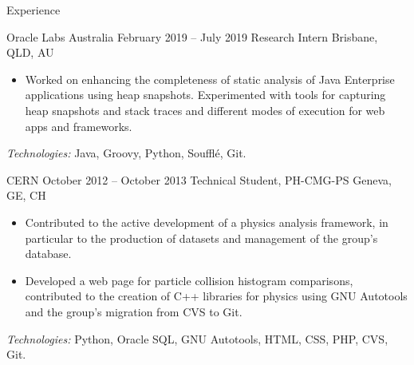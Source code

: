\documentclass{resume}
\begin{document}
\begin{rSection}{Experience}
\begin{rSubsection}
  {Oracle Labs Australia}
  {February 2019 -- July 2019}
  {Research Intern}
  {Brisbane, QLD, AU}
  \begin{itemize}[label={-}]
    \setlength\itemsep{-0.5em}
    \item Worked on enhancing the completeness of static analysis of Java Enterprise applications using heap snapshots. Experimented with tools for capturing heap snapshots and stack traces and different modes of execution for web apps and frameworks.
  \end{itemize}
\footnotesize\textcolor{TechsColor}{\textit{Technologies:} Java, Groovy, Python, Soufflé, Git.}
\end{rSubsection}

\begin{rSubsection}
  {CERN}
  {October 2012 -- October 2013}
  {Technical Student, PH-CMG-PS}
  {Geneva, GE, CH}

  \begin{itemize}[label={-}]
    \setlength\itemsep{-0.5em}
    \item Contributed to the active development of a physics analysis framework, in particular to the production of datasets and management of the group's database.
    \item Developed a web page for particle collision histogram comparisons, contributed to the creation of C++ libraries for physics using GNU Autotools and the group's migration from CVS to Git.
  \end{itemize}
  \footnotesize\textcolor{TechsColor}{\textit{Technologies:} Python, Oracle SQL, GNU Autotools, HTML, CSS, PHP, CVS, Git.}
\end{rSubsection}
\end{rSection}
\end{document}
